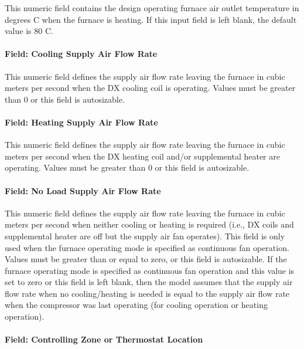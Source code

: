 This numeric field contains the design operating furnace air outlet temperature in degrees C when the furnace is heating. If this input field is left blank, the default value is 80 C.

\paragraph{Field: Cooling Supply Air Flow Rate}\label{field-cooling-supply-air-flow-rate-1-000}

This numeric field defines the supply air flow rate leaving the furnace in cubic meters per second when the DX cooling coil is operating. Values must be greater than 0 or this field is autosizable.

\paragraph{Field: Heating Supply Air Flow Rate}\label{field-heating-supply-air-flow-rate-1-000}

This numeric field defines the supply air flow rate leaving the furnace in cubic meters per second when the DX heating coil and/or supplemental heater are operating. Values must be greater than 0 or this field is autosizable.

\paragraph{Field: No Load Supply Air Flow Rate}\label{field-no-load-supply-air-flow-rate-1-000}

This numeric field defines the supply air flow rate leaving the furnace in cubic meters per second when neither cooling or heating is required (i.e., DX coils and supplemental heater are off but the supply air fan operates). This field is only used when the furnace operating mode is specified as continuous fan operation. Values must be greater than or equal to zero, or this field is autosizable. If the furnace operating mode is specified as continuous fan operation and this value is set to zero or this field is left blank, then the model assumes that the supply air flow rate when no cooling/heating is needed is equal to the supply air flow rate when the compressor was last operating (for cooling operation or heating operation).

\paragraph{Field: Controlling Zone or Thermostat Location}\label{field-controlling-zone-or-thermostat-location-1}

